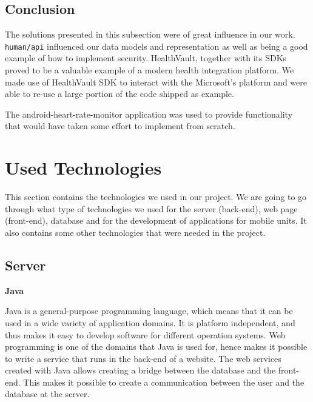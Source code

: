\subsection{Conclusion}

The solutions presented in this subsection were of great influence in our work.
\verb|human/api| influenced our data models and representation as well as being a good
example of how to implement security.
HealthVault, together with its SDKs proved to be a valuable example of a modern health integration platform.
We made use of HealthVault SDK to interact with the Microsoft's platform and were able to re-use
a large portion of the code shipped as example.

The android-heart-rate-monitor application was used to provide functionality that would have taken some
effort to implement from scratch.


\section{Used Technologies}
\label{section:used-technologies}

This section contains the technologies we used in our project.
We are going to go through what type of technologies we used for the server (back-end), web page (front-end), database and for the development of applications for mobile units. 
It also contains some other technologies that were needed in the project.

\subsection{Server}

\textbf{Java} \nocite{Java}

Java is a general-purpose programming language, which means that it can be used in a wide variety of application domains.
It is platform independent, and thus makes it easy to develop software for different operation systems.
Web programming is one of the domains that Java is used for, hence makes it possible to write a service that runs in the back-end of a website.
The web services created with Java allows creating a bridge between the database and the front-end. 
This makes it possible to create a communication between the user and the database at the server.

